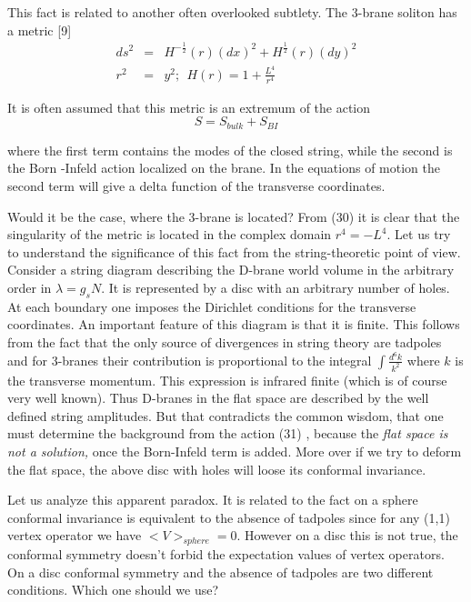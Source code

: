 \documentclass[a4paper,12pt]{article}
\begin{document}
This fact is related to another often overlooked subtlety. The 3-brane
soliton has a metric [9] 
\begin{eqnarray}
ds^{2} &=&H^{-\frac{1}{2}}(r)(dx)^{2}+H^{\frac{1}{2}}(r)(dy)^{2} \\
r^{2} &=&y^{2};\ \ H(r)=1+\frac{L^{4}}{r^{4}}
\end{eqnarray}

It is often assumed that this metric is an extremum of the action 
\begin{equation}
S=S_{bulk}+S_{BI}
\end{equation}

where the first term contains the modes of the closed string, while the
second is the Born -Infeld action localized on the brane. In the equations
of motion the second term will give a delta function of the transverse
coordinates.

Would it be the case, where the 3-brane is located? From (30) it is clear
that the singularity of the metric is located in the complex domain $%
r^{4}=-L^{4}.$ Let us try to understand the significance of this fact from
the string-theoretic point of view. Consider a string diagram describing the
D-brane world volume in the arbitrary order in $\lambda =g_{s}N.$ It is
represented by a disc with an arbitrary number of holes. At each boundary
one imposes the Dirichlet conditions for the transverse coordinates. An
important feature of this diagram is that it is finite. This follows from
the fact that the only source of divergences in string theory are tadpoles
and for 3-branes their contribution is proportional to the integral $\int 
\frac{d^{6}k}{k^{2}}$ where $k$ is the transverse momentum. This expression
is infrared finite (which is of course very well known). Thus D-branes in
the flat space are described by the well defined string amplitudes. But that
contradicts the common wisdom, that one must determine the background from
the action (31) , because the \emph{flat space is not a solution, }once the
Born-Infeld term is added. More over if we try to deform the flat space, the
above disc with holes will loose its conformal invariance.

Let us analyze this apparent paradox. It is related to the fact on a sphere
conformal invariance is equivalent to the absence of tadpoles since for any
(1,1) vertex operator we have $<V>_{sphere}=0$. However on a disc this is
not true, the conformal symmetry doesn't forbid the expectation values of
vertex operators. On a disc conformal symmetry and the absence of tadpoles
are two different conditions. Which one should we use?
\end{document}
